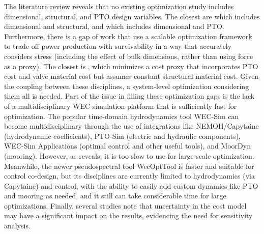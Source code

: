 The literature review reveals that no existing optimization study includes dimensional, structural, and PTO design variables.
The closest are \cite{ambuhl_reliability-based_2014} which includes dimensional and structural, and \cite{grasberger_control_2024} which includes dimensional and PTO.
Furthermore, there is a gap of work that use a scalable optimization framework to trade off power production with survivability in a way that accurately considers stress (including the effect of bulk dimensions, rather than using force as a proxy).
The closest is \cite{rosati_control_2023}, which minimizes a cost proxy that incorporates PTO cost and valve material cost but assumes constant structural material cost.
Given the coupling between these disciplines, a system-level optimization considering them all is needed.
Part of the issue in filling these optimization gaps is the lack of a multidisciplinary WEC simulation platform that is sufficiently fast for optimization.
The popular time-domain hydrodynamics tool WEC-Sim \cite{ruehl_wec-simwec-sim_2024} can become multidisciplinary through the use of integrations like NEMOH/Capytaine (hydrodynamic coefficients), PTO-Sim (electric and hydraulic components), WEC-Sim Applications (optimal control and other useful tools), and MoorDyn (mooring).
However, as \cite{housner_numerical_2024} reveals, it is too slow to use for large-scale optimization.
Meanwhile, the newer pseudospectral tool WecOptTool \cite{coe_initial_2020} is faster and suitable for control co-design, but its disciplines are currently limited to hydrodynamics (via Capytaine) and control, with the ability to easily add custom dynamics like PTO and mooring as needed, and it still can take considerable time for large optimizations.
Finally, several studies note that uncertainty in the cost model may have a significant impact on the results, evidencing the need for sensitivity analysis.

